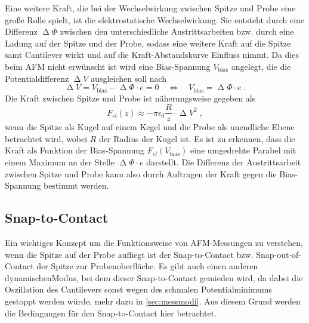     Eine weitere Kraft, die bei der Wechselwirkung zwischen Spitze und Probe eine große Rolle spielt, ist die elektrostatische Wechselwirkung.
    Sie entsteht durch eine Differenz $\upDelta \Phi$ zwischen den unterschiedliche Austrittsarbeiten bzw. durch eine Ladung auf der Spitze und der Probe, sodass eine weitere Kraft auf die Spitze samt Cantilever wirkt und auf die Kraft-Abstandskurve Einfluss nimmt.
    Da dies beim AFM nicht erwünscht ist wird eine Bias-Spannung $V_{\mathrm{bias}}$ angelegt, die die Potentialdifferenz $\upDelta V$ ausgleichen soll nach 
    \begin{equation}
        \upDelta V = V_{\mathrm{bias}} - \upDelta \Phi \cdot e = 0 \quad \Leftrightarrow \quad V_{\mathrm{bias}} = \upDelta \Phi \cdot e \;.
    \end{equation}
    Die Kraft zwischen Spitze und Probe ist näherungsweise gegeben als
    \begin{equation}
        F_{el}(z) \approx -\pi \epsilon_0 \frac{R}{z} \cdot \upDelta V^2 \;,
    \end{equation}
    wenn die Spitze als Kugel auf einem Kegel und die Probe als unendliche Ebene betrachtet wird, wobei $R$ der Radius der Kugel ist.
    Es ist zu erkennen, dass die Kraft als Funktion der Bias-Spannung $F_{el}(V_{\mathrm{bias}})$ eine umgedrehte Parabel mit einem Maximum an der Stelle $\upDelta \Phi \cdot e$ darstellt.
    Die Differenz der Austrittsarbeit zwischen Spitze und Probe kann also durch Auftragen der Kraft gegen die Bias-Spannung bestimmt werden.

\subsection{Snap-to-Contact}
\label{sec:Snap}
    Ein wichtiges Konzept um die Funktionsweise von AFM-Messungen zu verstehen, wenn die Spitze auf der Probe aufliegt ist der Snap-to-Contact bzw. Snap-out-of-Contact der Spitze zur Probenoberfläche.
    Es gibt auch einen anderen \glqq dynamischen\grqq Modus, bei dem dieser Snap-to-Contact gemieden wird, da dabei die Oszillation des Cantilevers sonst wegen des schmalen Potentialminimums gestoppt werden würde, mehr dazu in \autoref{sec:messmodi}.
    Aus diesem Grund werden die Bedingungen für den Snap-to-Contact hier betrachtet.


